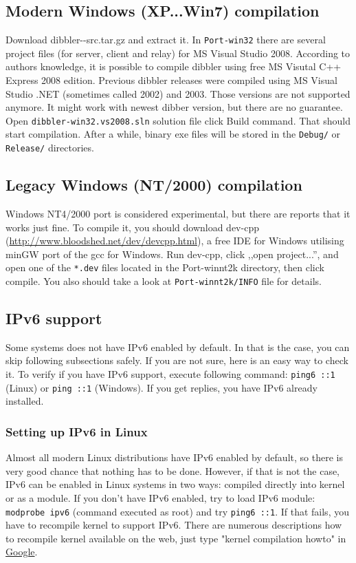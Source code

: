\subsection{Modern Windows (XP...Win7) compilation}
Download dibbler-\version-src.tar.gz and extract it. In
\verb+Port-win32+ there are several project files (for server, client
and relay) for MS Visual Studio 2008. According to authors knowledge,
it is possible to compile dibbler using free MS Visutal C++ Express
2008 edition. Previous dibbler releases were compiled using MS Visual
Studio .NET (sometimes called 2002) and 2003. Those versions are not
supported anymore. It might work with newest dibber version, but there
are no guarantee. Open \verb+dibbler-win32.vs2008.sln+ solution file
click Build command. That should start compilation. After a while,
binary exe files will be stored in the \verb+Debug/+ or
\verb+Release/+ directories.

\subsection{Legacy Windows (NT/2000) compilation}
Windows NT4/2000 port is considered experimental, but there are reports
that it works just fine. To compile it, you should download dev-cpp
(\url{http://www.bloodshed.net/dev/devcpp.html}), a free IDE for
Windows utilising minGW port of the gcc for Windows. Run dev-cpp,
click ,,open project...'', and open one of the \verb+*.dev+ files located
in the Port-winnt2k directory, then click compile. You also should
take a look at \verb+Port-winnt2k/INFO+ file for details.


\subsection{IPv6 support}
Some systems does not have IPv6 enabled by default. In that is the case,
you can skip following subsections safely. If you are not sure, here is
an easy way to check it. To verify if you have IPv6 support, execute
following command: \verb+ping6 ::1+ (Linux) or \verb+ping ::1+
(Windows). If you get replies, you have IPv6 already installed.

\subsubsection{Setting up IPv6 in Linux}
Almost all modern Linux distributions have IPv6 enabled by default, so there
is very good chance that nothing has to be done. However, if that is
not the case, IPv6 can be enabled in Linux systems in two ways:
compiled directly into kernel or as a module. If you don't have IPv6
enabled, try to load IPv6 module: \verb+modprobe ipv6+ (command
executed as root) and try \verb+ping6 ::1+. If that fails, you have to
recompile kernel to support IPv6. There are numerous descriptions how
to recompile kernel available on the web, just type "kernel
compilation howto" in \href{http://www.google.com}{Google}.

